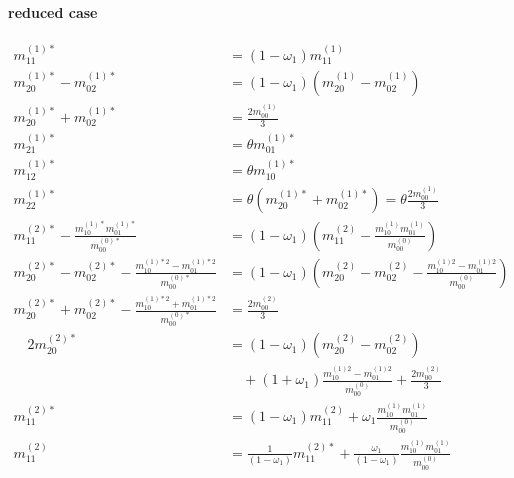 \documentclass{article}
\begin{document}
  \paragraph{reduced case}
  \begin{align}
    m_{11}^{(1)*} & = (1-\omega_1) m_{11}^{(1)}\tag{R1} \\
    m_{20}^{(1)*} - m_{02}^{(1)*}
      & = (1-\omega_1) (m_{20}^{(1)} - m_{02}^{(1)})\tag{R2} \\
    m_{20}^{(1)*} + m_{02}^{(1)*}
      & =  \frac{2 m_{00}^{(1)}}{3}\tag{R3} \\
    m_{21}^{(1)*} & = \theta m_{01}^{(1)*}\tag{R4} \\
    m_{12}^{(1)*} & = \theta m_{10}^{(1)*}\tag{R5} \\
    m_{22}^{(1)*} & = \theta (m_{20}^{(1)*} + m_{02}^{(1)*}) = \theta \frac{2 m_{00}^{(1)}}{3}\tag{R6} \\
    m_{11}^{(2)*} - \frac{ m_{10}^{(1)*}m_{01}^{(1)*}}{m_{00}^{(0)*}}
    & = (1-\omega_1)\left(m_{11}^{(2)} - \frac{ m_{10}^{(1)}m_{01}^{(1)}}{m_{00}^{(0)}}\right)\tag{R7} \\
    m_{20}^{(2)*}-m_{02}^{(2)*} - \frac{ m_{10}^{(1)*2} - m_{01}^{(1)*2}}{m_{00}^{(0)*}}
    & = (1-\omega_1) \left(m_{20}^{(2)}-m_{02}^{(2)} - \frac{ m_{10}^{(1)2} - m_{01}^{(1)2}}{m_{00}^{(0)}}\right)\tag{R8} \\
    m_{20}^{(2)*}+m_{02}^{(2)*} - \frac{ m_{10}^{(1)*2} + m_{01}^{(1)*2}}{m_{00}^{(0)*}}
    & = \frac{2 m_{00}^{(2)}}{3} \tag{R9} \\
    \quad2m_{20}^{(2)*}
    & = (1-\omega_1) (m_{20}^{(2)}-m_{02}^{(2)})\nonumber \\
    &\quad+ (1+\omega_1)\frac{ m_{10}^{(1)2} - m_{01}^{(1)2}}{m_{00}^{(0)}} + \frac{2 m_{00}^{(2)}}{3}\tag{R10} \\
    m_{11}^{(2)*}
    & = (1-\omega_1)m_{11}^{(2)} + \omega_1 \frac{ m_{10}^{(1)}m_{01}^{(1)}}{m_{00}^{(0)}}\tag{R11} \\
    m_{11}^{(2)}
    & = \frac{1}{(1-\omega_1)}m_{11}^{(2)*} + \frac{\omega_1}{(1-\omega_1)} \frac{ m_{10}^{(1)}m_{01}^{(1)}}{m_{00}^{(0)}}\tag{R12}
  \end{align}
\end{document}
